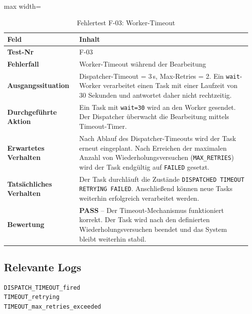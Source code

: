 \documentclass[a4paper,12pt]{article}
\begin{document}
\begin{table}[H]
    \centering
    \begin{adjustbox}{max width=\textwidth}
    \begin{tabular}{>{\bfseries}p{4.5cm} p{10cm}}
        \toprule
        Feld & Inhalt \\
        \midrule
        Test-Nr              & F-03 \\
        Fehlerfall           & Worker-Timeout während der Bearbeitung \\
        Ausgangssituation    & Dispatcher-Timeout = 3\,s, Max-Retries = 2.
                               Ein \texttt{wait}-Worker verarbeitet einen Task mit
                               einer Laufzeit von 30 Sekunden und antwortet daher nicht rechtzeitig. \\
        Durchgeführte Aktion & Ein Task mit \texttt{wait=30} wird an den Worker gesendet.
                               Der Dispatcher überwacht die Bearbeitung mittels Timeout-Timer. \\
        Erwartetes Verhalten & Nach Ablauf des Dispatcher-Timeouts wird der Task erneut eingeplant.
                               Nach Erreichen der maximalen Anzahl von Wiederholungsversuchen
                               (\texttt{MAX\_RETRIES}) wird der Task endgültig auf \texttt{FAILED} gesetzt. \\
        Tatsächliches Verhalten & Der Task durchläuft die Zustände
                               \texttt{DISPATCHED \textrightarrow{} TIMEOUT \textrightarrow{} RETRYING \textrightarrow{} FAILED}.
                               Anschließend können neue Tasks weiterhin erfolgreich verarbeitet werden. \\
        Bewertung            & \textbf{PASS} -- Der Timeout-Mechanismus funktioniert korrekt.
                               Der Task wird nach den definierten Wiederholungsversuchen beendet und das
                               System bleibt weiterhin stabil. \\
        \bottomrule
    \end{tabular}
    \end{adjustbox}
    \caption{Fehlertest F-03: Worker-Timeout}
\end{table}

\subsection*{Relevante Logs}

\begin{lstlisting}[style=log]
DISPATCH_TIMEOUT_fired
TIMEOUT_retrying
TIMEOUT_max_retries_exceeded
\end{lstlisting}
\end{document}
